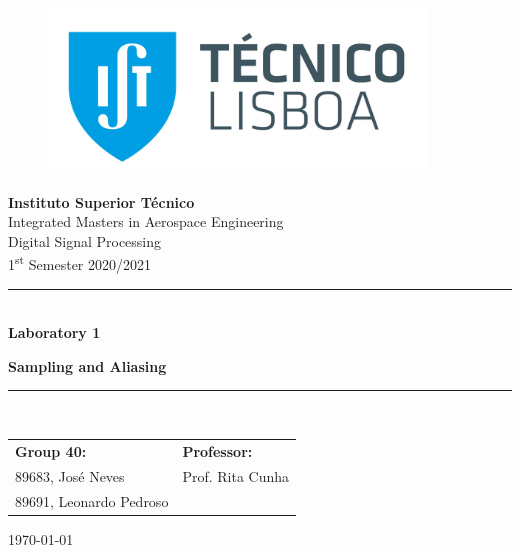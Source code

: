 \documentclass[a4paper, oneside, 11pt]{article}
\begin{document}
\begin{titlepage}
	\begin{center}
		\begin{figure}[htb!]
			\centering
				\includegraphics[width=10cm]{figures/istlogo.jpg}
		\end{figure}
        
        \LARGE{\textbf{Instituto Superior Técnico}}\\
        \vspace{20pt}
        \Large{Integrated Masters in Aerospace Engineering}\\
        \vspace{10pt}
        \Large{Digital Signal Processing}\\
        \vspace{10pt}
        \Large{1\textsuperscript{st} Semester 2020/2021}\\
            
        \vspace{40pt}
        \noindent\rule{15cm}{1pt}\\
        \Huge{\center \textbf{Laboratory 1}} 
        \par 
        \Huge{\center \textbf{Sampling and Aliasing}}\\
        \noindent\rule{15cm}{1pt}\\
        
        \vspace{60pt}
        \large{\begin{tabular}{ll}
            \textbf{Group 40:} & \textbf{Professor:} \\
            89683, José Neves & Prof. Rita Cunha\\
            89691, Leonardo Pedroso \hspace{1cm} & \\
        \end{tabular}}
    
        \vspace{60pt}
        \large{\today}
	\end{center}
\end{titlepage}
\end{document}
